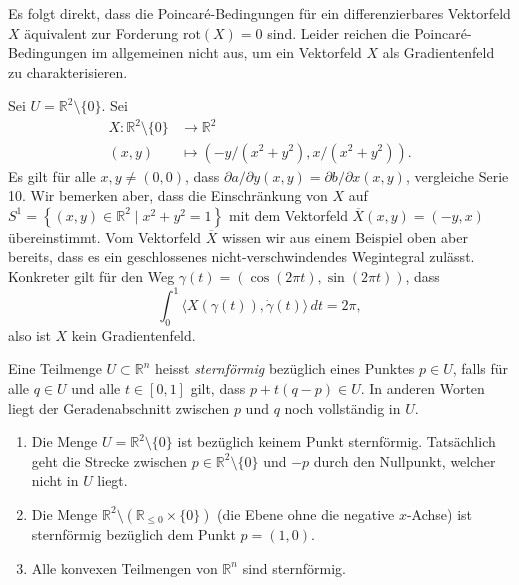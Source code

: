 \documentclass[../main.tex]{subfiles}
\begin{document}
Es folgt direkt, dass die Poincaré-Bedingungen für
ein differenzierbares Vektorfeld $X$ äquivalent
zur Forderung $\text{rot}(X) = 0$ sind.
Leider reichen die Poincaré-Bedingungen im allgemeinen
nicht aus, um ein Vektorfeld $X$ als Gradientenfeld
zu charakterisieren.

\begin{example}
  Sei $U = \mathbb{R}^2 \setminus \{0\}$.
  Sei
  \begin{align*}
    X \colon \mathbb{R}^2 \setminus \{0\} & \to \mathbb{R}^2 \\
    (x, y) & \mapsto (-y/(x^2 + y^2), x/(x^2 + y^2)).
  \end{align*}
  Es gilt für alle $x, y \neq (0, 0)$, dass
  $\partial a / \partial y (x, y) = \partial b/ \partial x(x, y)$,
  vergleiche Serie 10.
  Wir bemerken aber, dass die Einschränkung von $X$
  auf $S^1 = \left\{(x, y) \in \mathbb{R}^2 \mid x^2 + y^2 = 1\right\}$
  mit dem Vektorfeld $\overline X(x, y) = (-y, x)$ übereinstimmt.
  Vom Vektorfeld $\overline X$ wissen wir aus einem Beispiel
  oben aber bereits, dass es ein geschlossenes nicht-verschwindendes
  Wegintegral zulässt.
  Konkreter gilt für den Weg
  $\gamma(t) = (\cos(2 \pi t), \sin (2 \pi t))$, dass
  \[
    \int_{0}^{1} \langle X(\gamma(t)), \dot \gamma(t) \rangle \, dt
    = 2\pi,
  \]
  also ist $X$ kein Gradientenfeld.
\end{example}

\begin{definition}
  Eine Teilmenge $U \subset \mathbb{R}^n$
  heisst \emph{sternförmig} bezüglich eines Punktes $p \in U$,
  falls für alle $q \in U$ und alle $t \in [0, 1]$
  gilt, dass $p + t(q - p) \in U$.
  In anderen Worten liegt der Geradenabschnitt zwischen $p$ und $q$
  noch vollständig in $U$.
\end{definition}

\begin{examples}
  \leavevmode
  \begin{enumerate}[(1)]
    \item Die Menge $U = \mathbb{R}^2 \setminus \{0 \}$ ist bezüglich
      keinem Punkt sternförmig.
      Tatsächlich geht die Strecke zwischen
      $p \in \mathbb{R}^2 \setminus \{0\}$
      und $-p$ durch den Nullpunkt, welcher nicht in $U$ liegt.
    \item Die Menge $\mathbb{R}^2 \setminus (\mathbb{R}_{\leq 0}
      \times \{0\})$ (die Ebene ohne die negative $x$-Achse)
      ist sternförmig bezüglich dem Punkt
      $p = (1, 0)$.
    \item Alle konvexen Teilmengen von $\mathbb{R}^n$ sind sternförmig.
  \end{enumerate}
\end{examples}
\end{document}
